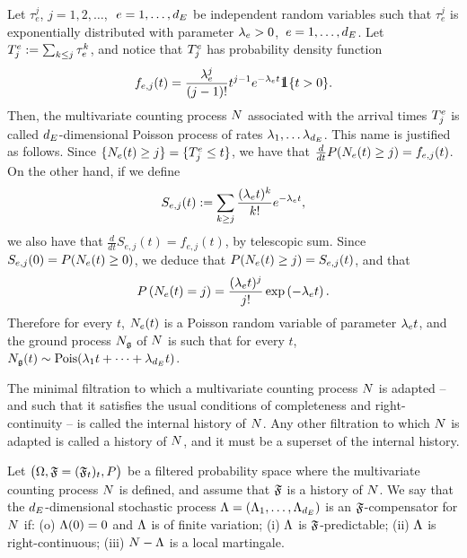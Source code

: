 \documentclass[10pt, article,table]{article}
\begin{document}
\begin{example}
 Let $\tau_e^j$, $j=1,2,\dots$, $\, \, e=1,\dots, \numEventTypes$ be independent random variables such that $\tau_e^j$ is exponentially distributed with parameter $\intensity>0$, $\, e=1,\dots, \numEventTypes$. Let $\arrivalTimes_{j} := \sum_{k\leq j} \tau_e^{k}$, and notice that $\arrivalTimes_{j}$ has probability density function 
 \begin{equation*}
  f_{e,j}(t) = \frac{\intensity^j}{(j-1)!}t^{j-1} e^{-\intensity t} \one\lbrace t>0\rbrace.
 \end{equation*}
 Then, the multivariate counting process $\multiCountingProc$ associated with the arrival times $\arrivalTimes_{j}$ is called $\numEventTypes$-dimensional Poisson process of rates $\intensity[1], \dots \intensity[\numEventTypes]$. This name is justified as follows. 
 Since $\lbrace \countingProc(t)\geq j\rbrace = \lbrace \arrivalTimes_{j} \leq t\rbrace$, we have that $\frac{d}{dt} \Prob(\countingProc(t) \geq j) = f_{e,j} (t)$. On the other hand, if we define 
 \begin{equation*}
  S_{e,j}(t) := \sum_{k\geq j} \frac{(\intensity t)^k}{k!}e^{-\intensity t},
 \end{equation*}
we also have that $\frac{d}{dt} S_{e,j}(t) = f_{e,j}(t)$, by telescopic sum. Since $S_{e,j}(0) = \Prob (\countingProc(t)\geq 0)$, we deduce that $\Prob(\countingProc(t) \geq j) = S_{e,j}(t)$, and that
\begin{equation*}
 \Prob\left( \countingProc(t) = j\right) = 
 \frac{(\intensity t)^j}{j!} \exp\left( -\intensity t\right).
\end{equation*}
Therefore for every $t$, $\countingProc(t)$ is a Poisson random variable of parameter $\intensity t$, and the ground process $\groundProc$ of $\multiCountingProc$ is such that for every $t$, $\groundProc(t) \sim \text{Pois}(\intensity[1]t + \dots + \intensity[\numEventTypes]t)$.
\end{example}

The minimal filtration to which a multivariate counting process $\multiCountingProc$ is adapted -- and such that it satisfies the usual conditions of completeness and right-continuity -- is called the internal history of $\multiCountingProc$. Any other filtration to which $\multiCountingProc$ is adapted is called a history of $\multiCountingProc$, and it must be a superset of the internal history. 

\begin{defi}\label{def.compensator}
 Let $\stochasticBase$ be a filtered probability space where the multivariate counting process $\multiCountingProc$ is defined, and assume that $\filtrationF$ is a history of $\multiCountingProc$. We say that the $\numEventTypes$-dimensional stochastic process $\compensator = (\compensator_1, \dots , \compensator_{\numEventTypes})$ is an $\filtrationF$-compensator for $\multiCountingProc$ if: (o) $\compensator(0)=0$ and $\compensator$ is of finite variation; (i) $\compensator$ is $\filtrationF$-predictable; (ii) $\compensator$ is right-continuous; (iii) $\multiCountingProc - \compensator$ is a local martingale. 
\end{defi}
\end{document}
